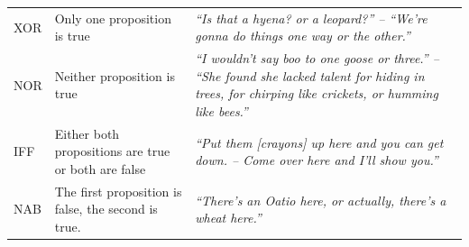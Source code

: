 \documentclass[,man,floatsintext]{apa6}
\begin{document}
\begin{longtable}[]{@{}lll@{}}
\begin{minipage}[t]{0.06\columnwidth}
XOR\strut
\end{minipage} & \begin{minipage}[t]{0.36\columnwidth}\raggedright
Only one proposition is true\strut
\end{minipage} & \begin{minipage}[t]{0.49\columnwidth}\raggedright
\emph{\enquote{Is that a hyena? or a leopard?} -- \enquote{We're gonna do things one way or the other.}}\strut
\end{minipage}\tabularnewline
\begin{minipage}[t]{0.06\columnwidth}\raggedright
NOR\strut
\end{minipage} & \begin{minipage}[t]{0.36\columnwidth}\raggedright
Neither proposition is true\strut
\end{minipage} & \begin{minipage}[t]{0.49\columnwidth}\raggedright
\emph{\enquote{I wouldn't say boo to one goose or three.} -- \enquote{She found she lacked talent for hiding in trees, for chirping like crickets, or humming like bees.}}\strut
\end{minipage}\tabularnewline
\begin{minipage}[t]{0.06\columnwidth}\raggedright
IFF\strut
\end{minipage} & \begin{minipage}[t]{0.36\columnwidth}\raggedright
Either both propositions are true or both are false\strut
\end{minipage} & \begin{minipage}[t]{0.49\columnwidth}\raggedright
\emph{\enquote{Put them {[}crayons{]} up here and you can get down. -- Come over here and I'll show you.}}\strut
\end{minipage}\tabularnewline
\begin{minipage}[t]{0.06\columnwidth}\raggedright
NAB\strut
\end{minipage} & \begin{minipage}[t]{0.36\columnwidth}\raggedright
The first proposition is false, the second is true.\strut
\end{minipage} & \begin{minipage}[t]{0.49\columnwidth}\raggedright
\emph{\enquote{There's an Oatio here, or actually, there's a wheat here.}}\strut
\end{minipage}\tabularnewline
\bottomrule
\end{longtable}
\end{document}
